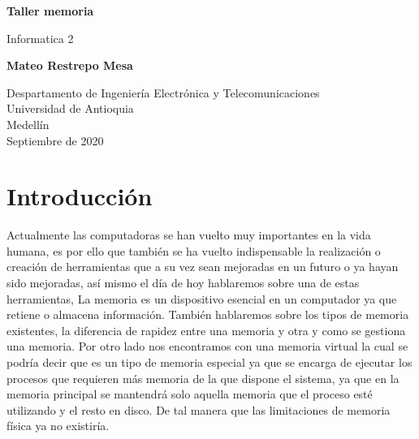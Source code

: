 \documentclass{article}
\begin{document}
\begin{titlepage}
    \begin{center}
        \vspace*{1cm}
            
        \Huge
        \textbf{Taller memoria}
            
        \vspace{0.5cm}
        \LARGE
        Informatica 2
            
        \vspace{1.5cm}
            
        \textbf{ Mateo Restrepo Mesa }
            
        \vfill
            
        \vspace{0.8cm}
            
        \Large
        Despartamento de Ingeniería Electrónica y Telecomunicaciones\\
        Universidad de Antioquia\\
        Medellín\\
        Septiembre de 2020
            
    \end{center}
\end{titlepage}
\tableofcontents

\section{Introducción}

Actualmente las computadoras se han vuelto muy importantes en la vida 
humana, es por ello que también se ha vuelto indispensable la realización o creación de 
herramientas que a su vez sean mejoradas en un futuro o ya hayan sido mejoradas, así mismo el día de hoy hablaremos sobre una de estas herramientas, 
La memoria es un dispositivo esencial en un computador ya que retiene o almacena información. 
También hablaremos sobre los tipos de memoria existentes, la diferencia de rapidez entre una memoria y otra y como se gestiona una memoria.
Por otro lado nos encontramos con una memoria virtual la cual se podría decir que es un tipo de memoria especial ya que se encarga de ejecutar los procesos que requieren más memoria de la que dispone el sistema, ya que en la memoria principal se mantendrá solo aquella memoria que el proceso esté utilizando y el resto en disco. De tal manera que las limitaciones de memoria física ya no existiría. \newpage
\end{document}
